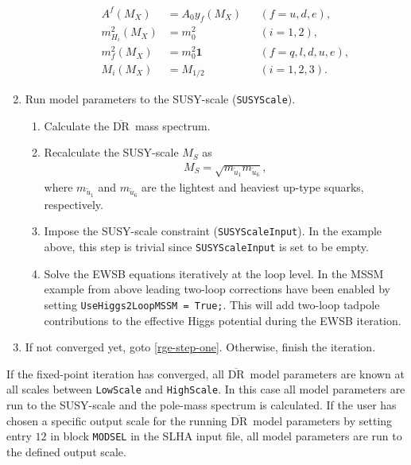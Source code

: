 \documentclass[final,3p,11pt,pdflatex]{elsarticle}
\newcommand{\code}[1]{\lstinline|#1|}  %
\newcommand{\textoverline}[1]{$\overline{\mbox{#1}}$}
\newcommand{\DRbar}{\textoverline{DR}\xspace}
\begin{document}
\begin{enumerate}
\begin{enumerate}
    \begin{align}
      A^f(M_X) &= A_0 y_f(M_X) & &(f=u,d,e),\\
      m_{H_i}^2(M_X) &= m_0^2 & &(i=1,2),\\
      m_{f}^2(M_X) &= m_0^2\mathbf{1} & &(f=q,l,d,u,e),\\
      M_{i}(M_X) &= M_{1/2} & &(i=1,2,3).
    \end{align}\label{eq:fs-cmssm-high-scale-bc}%
  \end{enumerate}
\item Run model parameters to the SUSY-scale (\code{SUSYScale}).
  \begin{enumerate}
  \item Calculate the \DRbar\ mass spectrum.
  \item Recalculate the SUSY-scale $M_S$ as
    \begin{align}
      M_S = \sqrt{m_{\tilde{u}_1}m_{\tilde{u}_6}},
    \end{align}
    where $m_{\tilde{u}_1}$ and $m_{\tilde{u}_6}$ are the lightest and
    heaviest up-type squarks, respectively.
  \item Impose the SUSY-scale constraint (\code{SUSYScaleInput}).  In
    the example above, this step is trivial since
    \code{SUSYScaleInput} is set to be empty.
  \item Solve the EWSB equations iteratively at the loop level.  In
    the MSSM example from above leading two-loop corrections have been
    enabled by setting \code{UseHiggs2LoopMSSM = True;}.  This will
    add two-loop tadpole contributions to the effective Higgs
    potential during the EWSB iteration.
  \end{enumerate}
\item If not converged yet, goto \ref{rge-step-one}.  Otherwise,
  finish the iteration.
\end{enumerate}
%
If the fixed-point iteration has converged, all \DRbar\ model
parameters are known at all scales between \code{LowScale} and
\code{HighScale}.  In this case all model parameters are run to the
SUSY-scale and the pole-mass spectrum is calculated.  If the user has
chosen a specific output scale for the running \DRbar\ model
parameters by setting entry $12$ in block \code{MODSEL} in the SLHA
input file, all model parameters are run to the defined output scale.
%
\end{document}
